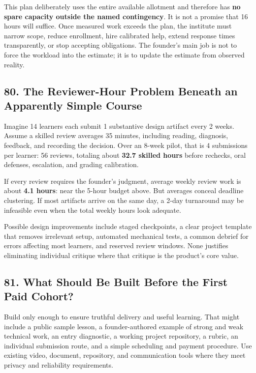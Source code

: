 This plan deliberately uses the entire available allotment and therefore has \textbf{no spare capacity outside the named contingency}. It is not a promise that 16 hours will suffice. Once measured work exceeds the plan, the institute must narrow scope, reduce enrollment, hire calibrated help, extend response times transparently, or stop accepting obligations. The founder's main job is not to force the workload into the estimate; it is to update the estimate from observed reality.

\subsection*{80. The Reviewer-Hour Problem Beneath an Apparently Simple Course}

Imagine 14 learners each submit 1 substantive design artifact every 2 weeks. Assume a skilled review averages 35 minutes, including reading, diagnosis, feedback, and recording the decision. Over an 8-week pilot, that is 4 submissions per learner: 56 reviews, totaling about \textbf{32.7 skilled hours} before rechecks, oral defenses, escalation, and grading calibration.

If every review requires the founder's judgment, average weekly review work is about \textbf{4.1 hours}: near the 5-hour budget above. But averages conceal deadline clustering. If most artifacts arrive on the same day, a 2-day turnaround may be infeasible even when the total weekly hours look adequate.

Possible design improvements include staged checkpoints, a clear project template that removes irrelevant setup, automated mechanical tests, a common debrief for errors affecting most learners, and reserved review windows. None justifies eliminating individual critique where that critique is the product's core value.

\subsection*{81. What Should Be Built Before the First Paid Cohort?}

Build only enough to ensure truthful delivery and useful learning. That might include a public sample lesson, a founder-authored example of strong and weak technical work, an entry diagnostic, a working project repository, a rubric, an individual submission route, and a simple scheduling and payment procedure. Use existing video, document, repository, and communication tools where they meet privacy and reliability requirements.

